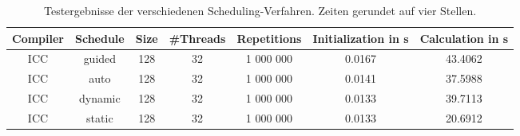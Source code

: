 \documentclass[german,plainarticle,hyperref,utf8]{zihpub}
\begin{document}
	\begin{table}
		\begin{center}
			\begin{tabular}{||c c c c c c c||}
				\hline
				Compiler & Schedule & Size & \#Threads & Repetitions & Initialization in s & Calculation in s \\ [1ex]
				\hline\hline
				ICC      & guided   & 128  & 32        & 1 000 000   & 0.0167                   & 43.4062                \\
				\hline
				ICC      & auto     & 128  & 32        & 1 000 000   & 0.0141                   & 37.5988                \\
				\hline
				ICC      & dynamic  & 128  & 32        & 1 000 000   & 0.0133                   & 39.7113                \\
				\hline
				ICC      & static   & 128  & 32        & 1 000 000   & 0.0133                   & 20.6912                \\
				\hline
			\end{tabular}
			\caption{\label{tab:sched}Testergebnisse der verschiedenen Scheduling-Verfahren. Zeiten gerundet auf vier Stellen.}
		\end{center}
	\end{table}
	\clearpage
	
\end{document}
